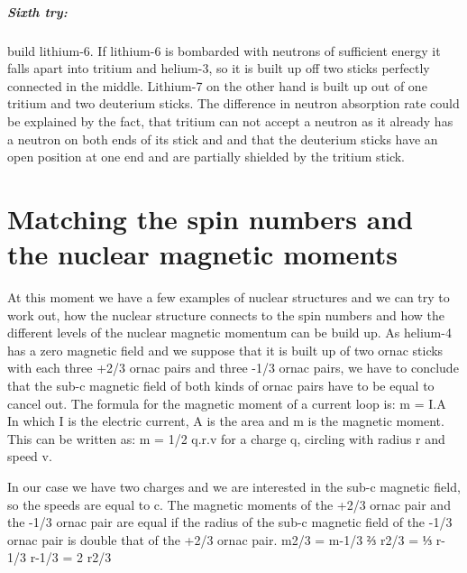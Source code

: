 \subparagraph{
Sixth try:} build lithium-6. If lithium-6 is bombarded with neutrons of sufficient energy it falls apart into tritium and helium-3, so it is built up off two sticks perfectly connected in the middle. Lithium-7 on the other hand is built up out of one tritium and two deuterium sticks. The difference in neutron absorption rate could be explained by the fact, that tritium can not accept a neutron as it already has a neutron on both ends of its stick and and that the deuterium sticks have an open position at one end and are partially shielded by the tritium stick.

\section{
Matching the spin numbers and the nuclear magnetic moments}

At this moment we have a few examples of nuclear structures and we can try to work out, how the nuclear structure connects to the spin numbers and how the different levels of the nuclear magnetic momentum can be build up.
As helium-4 has a zero magnetic field and we suppose that it is built up of two ornac sticks with each three +2/3 ornac pairs and three -1/3 ornac pairs, we have to conclude that the sub-c magnetic field of both kinds of ornac pairs have to be equal to cancel out. The formula for the magnetic moment of a current loop is:
m =  I.A
In which I is the electric current, A is the area and m is the magnetic moment. This can be written as:
m = 1/2 q.r.v
for a charge q, circling with radius r and speed v.

In our case we have two charges and we are interested in the sub-c magnetic field, so the speeds are equal to c. The magnetic moments of the +2/3 ornac pair and the -1/3 ornac pair are equal if the radius of the sub-c magnetic field of the -1/3 ornac pair is double that of the +2/3 ornac pair.
m2/3 = m-1/3
⅔ r2/3 = ⅓ r-1/3
r-1/3 = 2 r2/3

